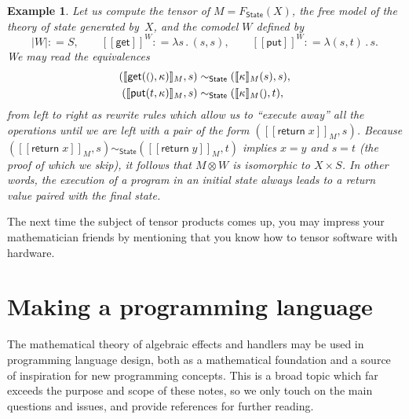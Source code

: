 \documentclass{amsart}
\newcommand{\theory}[1]{\mathsf{#1}} %
\newcommand{\Free}[2]{F_{\theory{#1}}(#2)} %
\newcommand{\lam}[1]{\lambda #1 \,.\,}
\newcommand{\unit}{{\text{\small$()$}}} %
\newcommand{\sem}[1]{[\![#1]\!]} %
\newcommand{\defeq}{\mathbin{{:}{=}}} %
\newcommand{\tensor}[2]{#1 \otimes #2} %
\newcommand{\kode}[1]{\mathsf{#1}}
\newcommand{\opcall}[3]{\kode{#1}(#2, #3)}
\newcommand{\return}[1]{\kode{return}\;#1}
\newtheorem{example}{Example}[section]
\begin{document}
\begin{example}
  Let us compute the tensor of $M = \Free{\theory{State}}{X}$, the free model of
  the theory of state generated by~$X$, and the comodel $W$ defined by
  \begin{equation*}
    |W| \defeq S,
    \qquad
    \sem{\kode{get}}^W \defeq \lam{s} (s, s),
    \qquad
    \sem{\kode{put}}^W \defeq \lam{(s,t)} s.
  \end{equation*}
  We may read the equivalences
  \begin{align*}
    (\sem{\opcall{get}{\unit}{\kappa}}_M, s) &\sim_{\theory{State}} (\sem{\kappa}_M (s), s), \\
    (\sem{\opcall{put}{t}{\kappa}}_M, s) &\sim_{\theory{State}} (\sem{\kappa}_M \unit, t),
  \end{align*}
  from left to right as rewrite rules which allow us to ``execute away'' all
  the operations until we are left with a pair of the form
  $(\sem{\return{x}}_M, s)$. Because
  $(\sem{\return{x}}_M, s) \sim_{\theory{State}} (\sem{\return{y}}_M, t)$
  implies $x = y$ and $s = t$ (the proof of which we skip), it follows that
  $\tensor{M}{W}$ is isomorphic to $X \times S$. In other words, the execution
  of a program in an initial state always leads to a return value paired with
  the final state.
\end{example}

The next time the subject of tensor products comes up, you may impress your
mathematician friends by mentioning that you know how to tensor software with
hardware.


\section{Making a programming language}
\label{sec:making-progr-lang}


The mathematical theory of algebraic effects and handlers may be used in
programming language design, both as a mathematical foundation and a source of
inspiration for new programming concepts. This is a broad topic which far
exceeds the purpose and scope of these notes, so we only touch on the main
questions and issues, and provide references for further reading.
\end{document}

